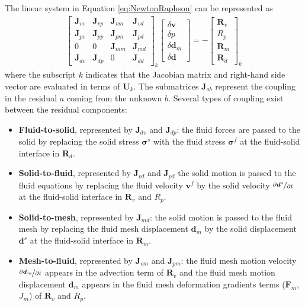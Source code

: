 \documentclass[sn-mathphys,Numbered]{sn-jnl}%
\newcommand{\bb}{\boldsymbol}
\begin{document}
The linear system in Equation \ref{eq:NewtonRaphson} can be represented as
\begin{eqnarray}
\begin{bmatrix}
\bb{J}_{vv} & \bb{J}_{vp} & \bb{J}_{vm} & \bb{J}_{vd} \\
\bb{J}_{pv} & \bb{J}_{pp} & \bb{J}_{pm} & \bb{J}_{pd} \\
0 & 0 & \bb{J}_{mm} & \bb{J}_{md} \\
\bb{J}_{dv} & \bb{J}_{dp} & 0 & \bb{J}_{dd}
\end{bmatrix}_k
\begin{bmatrix}
\delta \bb{v} \\
\delta p \\
\delta \bb{d}_m \\
\delta \bb{d}
\end{bmatrix}
=
-
\begin{bmatrix}
\bb{R}_v  \\
R_p \\
\bb{R}_m \\
\bb{R}_d
\end{bmatrix}_k
\end{eqnarray}
where the subscript $k$ indicates that the Jacobian matrix and right-hand side vector are evaluated in terms of $\bb{U}_k$.
The submatrices $\bb{J}_{ab}$ represent the coupling in the residual $a$ coming from the unknown $b$.
Several types of coupling exist between the residual components:
\begin{itemize}
	\item \textbf{Fluid-to-solid}, represented by $\bb{J}_{dv}$ and $\bb{J}_{dp}$:
	the fluid forces are passed to the solid by replacing the solid stress $\bb{\sigma}^s$ with the fluid stress $\bb{\sigma}^f$ at the fluid-solid interface in $\bb{R}_d$.
	\item \textbf{Solid-to-fluid}, represented by $\bb{J}_{vd}$ and $\bb{J}_{pd}$
	the solid motion is passed to the fluid equations by replacing the fluid velocity $\bb{v}^f$ by the solid velocity $\nicefrac{\partial \bb{d}^s}{\partial t}$ at the fluid-solid interface in $\bb{R}_v$ and $R_p$.
	\item \textbf{Solid-to-mesh}, represented by $\bb{J}_{md}$:
	the solid motion is passed to the fluid mesh by replacing the fluid mesh displacement $\bb{d}_m$ by the solid displacement $\bb{d}^s$ at the fluid-solid interface in $\bb{R}_m$. 
	\item \textbf{Mesh-to-fluid}, represented by $\bb{J}_{vm}$ and $\bb{J}_{pm}$:
	the fluid mesh motion velocity $\nicefrac{\partial \bb{d}_m}{\partial t}$ appears in the advection term of $\bb{R}_v$ and the fluid mesh motion displacement $\bb{d}_m$ appears in the fluid mesh deformation gradients terms ($\bb{F}_m$, $J_m$) of $\bb{R}_v$ and $R_p$.
\end{itemize}
\end{document}
